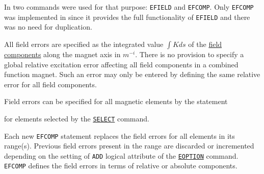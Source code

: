 In \madeight two commands were used for that purpose: \texttt{EFIELD} 
and \texttt{EFCOMP}.
Only \texttt{EFCOMP} was implemented in \madx since it provides the full 
functionality
of \texttt{EFIELD} and there was no need for duplication.  

All field errors are specified as the integrated value $\int K ds$ 
of the \hyperref[sec:sign-convention]{field components} along the magnet axis 
in $m^{-i}$. There is no provision
to specify a global relative excitation error affecting all field
components in a combined function magnet. Such an error may only be
entered by defining the same relative error for all field components.  

Field errors can be specified for all magnetic elements by the statement  


for elements selected by the
\hyperref[sec:select]{\texttt{SELECT}} command.

Each new \texttt{EFCOMP} statement replaces the field errors for all
elements in its range(s). Previous field errors present in the range are
discarded or incremented depending on the setting of
\texttt{ADD} logical attribute of the
\hyperref[sec:eoption]{\texttt{EOPTION}} command. 
\texttt{EFCOMP} defines the field errors in terms of
relative or absolute components.

